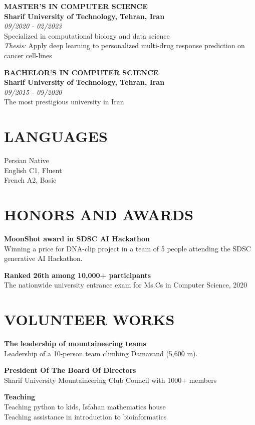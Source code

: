 \documentclass[9pt, letterpaper]{extarticle}
\begin{document}
\begin{minipage}[t]{0.32\textwidth}
\textbf{MASTER'S IN COMPUTER SCIENCE} \\[0.025cm]
\textbf{Sharif University of Technology, Tehran, Iran} \\[0.025cm]
\textit{09/2020 - 02/2023} \\[0.025cm]
Specialized in computational biology and data science \\[0.025cm]
\textit{Thesis:} Apply deep learning to personalized multi-drug response prediction on cancer cell-lines

\vspace{0.12cm}
\textbf{BACHELOR'S IN COMPUTER SCIENCE} \\[0.025cm]
\textbf{Sharif University of Technology, Tehran, Iran} \\[0.025cm]
\textit{09/2015 - 09/2020} \\[0.025cm]
The most prestigious university in Iran

\section{LANGUAGES}
\small

Persian Native \\[0.025cm]
English C1, Fluent \\[0.025cm]
French A2, Basic

\section{HONORS AND AWARDS}
\small

\textbf{MoonShot award in SDSC AI Hackathon} \\[0.025cm]
Winning a price for DNA-clip project in a team of 5 people attending the SDSC generative AI Hackathon.

\vspace{0.08cm}
\textbf{Ranked 26th among 10,000+ participants} \\[0.025cm]
The nationwide university entrance exam for Ms.Cs in Computer Science, 2020

\section{VOLUNTEER WORKS}
\small

\textbf{The leadership of mountaineering teams} \\[0.025cm]
Leadership of a 10-person team climbing Damavand (5,600 m).

\vspace{0.08cm}
\textbf{President Of The Board Of Directors} \\[0.025cm]
Sharif University Mountaineering Club Council with 1000+ members

\vspace{0.08cm}
\textbf{Teaching} \\[0.025cm]
Teaching python to kids, Isfahan mathematics house \\[0.025cm]
Teaching assistance in introduction to bioinformatics

\end{minipage}
\end{document}
